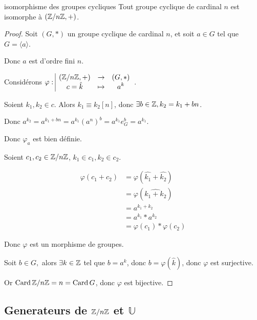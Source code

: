 \begin{theoreme}{isomorphisme des groupes cycliques}{}
    Tout groupe cyclique de cardinal $n$ est isomorphe à $(\mathbb{Z}/n\mathbb{Z}, +)$.
\end{theoreme}


\begin{proof}
    Soit $(G, \ast)$ un groupe cyclique de cardinal $n$, et soit $a \in G$ tel que $G = \langle a \rangle$.

    Donc $a$ est d'ordre fini $n$.

    Considérons $\varphi: \space \begin{array}{|ccc} \displaystyle (\mathbb{Z}/n\mathbb{Z}, +) & \to & \displaystyle (G, \ast) \\ \displaystyle c = \hat k & \mapsto & \displaystyle a^k \end{array}$.


    \svspace Soient $k_1, k_2 \in c$. Alors $k_1 \equiv k_2 [n]$, donc $\exists b \in \mathbb{Z}, k_2 = k_1 + bn$.
    
    Donc $a^{k_2} = a^{k_1 + bn} = a^{k_1} (a^n)^b = a^{k_1} e_G^b = a^{k_1}$.

    Donc $\varphi_a$ est bien définie.


    \svspace Soient $c_1, c_2 \in \mathbb{Z}/n\mathbb{Z}$, $k_1 \in c_1, k_2 \in c_2$.

    $$ \begin{aligned}
        \varphi(c_1 + c_2) & = \varphi(\hat{k_1} + \hat{k_2}) \\
        & = \varphi(\widehat{k_1 + k_2}) \\
        & = a^{k_1 + k_2} \\
        & = a^{k_1} \ast a^{k_2} \\
        & = \varphi(c_1) \ast \varphi(c_2)
    \end{aligned}$$

    Donc $\varphi$ est un morphisme de groupes.

    Soit $b \in G, $ alors $\exists k \in \mathbb{Z}$ tel que $b = a^k$, donc $b = \varphi(\hat k)$, donc $\varphi$ est surjective.

    Or $\operatorname{Card} \mathbb{Z}/n\mathbb{Z} = n = \operatorname{Card} G$, donc $\varphi$ est bijective.
\end{proof}

\subsection{Generateurs de \texorpdfstring{$\mathbb{Z} / n \mathbb{Z}$}{Z/nZ} et \texorpdfstring{$\mathbb U$}{U}}

